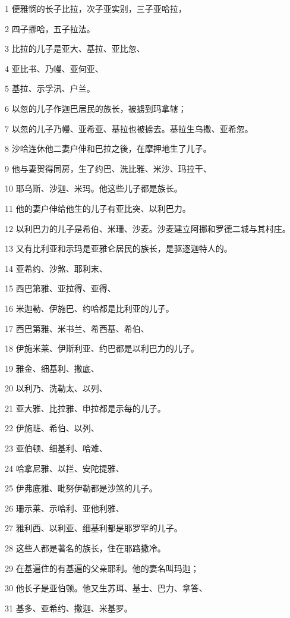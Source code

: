 \par 1 便雅悯的长子比拉，次子亚实别，三子亚哈拉，
\par 2 四子挪哈，五子拉法。
\par 3 比拉的儿子是亚大、基拉、亚比忽、
\par 4 亚比书、乃幔、亚何亚、
\par 5 基拉、示孚汛、户兰。
\par 6 以忽的儿子作迦巴居民的族长，被掳到玛拿辖；
\par 7 以忽的儿子乃幔、亚希亚、基拉也被掳去。基拉生乌撒、亚希忽。
\par 8 沙哈连休他二妻户伸和巴拉之後，在摩押地生了儿子。
\par 9 他与妻贺得同房，生了约巴、洗比雅、米沙、玛拉干、
\par 10 耶乌斯、沙迦、米玛。他这些儿子都是族长。
\par 11 他的妻户伸给他生的儿子有亚比突、以利巴力。
\par 12 以利巴力的儿子是希伯、米珊、沙麦。沙麦建立阿挪和罗德二城与其村庄。
\par 13 又有比利亚和示玛是亚雅仑居民的族长，是驱逐迦特人的。
\par 14 亚希约、沙煞、耶利末、
\par 15 西巴第雅、亚拉得、亚得、
\par 16 米迦勒、伊施巴、约哈都是比利亚的儿子。
\par 17 西巴第雅、米书兰、希西基、希伯、
\par 18 伊施米莱、伊斯利亚、约巴都是以利巴力的儿子。
\par 19 雅金、细基利、撒底、
\par 20 以利乃、洗勒太、以列、
\par 21 亚大雅、比拉雅、申拉都是示每的儿子。
\par 22 伊施班、希伯、以列、
\par 23 亚伯顿、细基利、哈难、
\par 24 哈拿尼雅、以拦、安陀提雅、
\par 25 伊弗底雅、毗努伊勒都是沙煞的儿子。
\par 26 珊示莱、示哈利、亚他利雅、
\par 27 雅利西、以利亚、细基利都是耶罗罕的儿子。
\par 28 这些人都是著名的族长，住在耶路撒冷。
\par 29 在基遍住的有基遍的父亲耶利。他的妻名叫玛迦；
\par 30 他长子是亚伯顿。他又生苏珥、基士、巴力、拿答、
\par 31 基多、亚希约、撒迦、米基罗。
